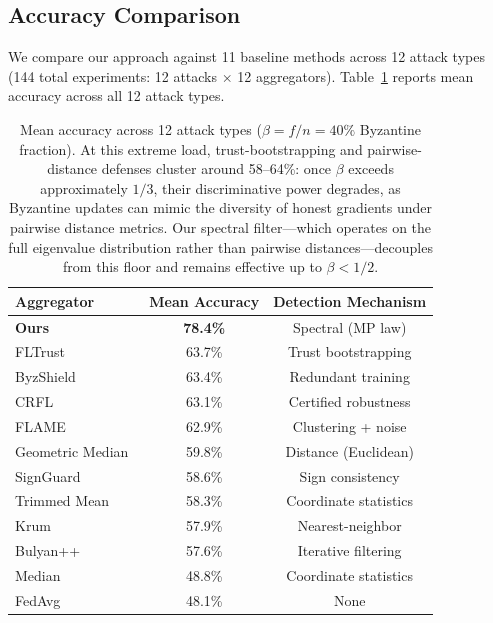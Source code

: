 \vspace{-4pt}
\subsection{Accuracy Comparison}

We compare our approach against 11 baseline methods across 12 attack types (144 total experiments: 12 attacks $\times$ 12 aggregators). Table~\ref{tab:accuracy_comparison} reports mean accuracy across all 12 attack types.

\begin{table}[!ht]
\centering
\caption{Mean accuracy across 12 attack types ($\beta = f/n = 40\%$ Byzantine fraction).
At this extreme load, trust-bootstrapping and pairwise-distance defenses cluster
around 58--64\%: once $\beta$ exceeds approximately $1/3$, their discriminative power
degrades, as Byzantine updates can mimic the diversity of honest gradients under
pairwise distance metrics.
Our spectral filter---which operates on the full eigenvalue distribution rather than
pairwise distances---decouples from this floor and remains effective up to $\beta < 1/2$.}
\label{tab:accuracy_comparison}
\begin{tabular}{|l|c|c|}
\hline
\textbf{Aggregator} & \textbf{Mean Accuracy} & \textbf{Detection Mechanism} \\
\hline
\textbf{Ours} & \textbf{78.4\%} & Spectral (MP law) \\
FLTrust~\cite{crfl} & 63.7\% & Trust bootstrapping \\
ByzShield~\cite{byzshield} & 63.4\% & Redundant training \\
CRFL~\cite{crfl_cert} & 63.1\% & Certified robustness \\
FLAME~\cite{flame} & 62.9\% & Clustering + noise \\
Geometric Median~\cite{geometric_median} & 59.8\% & Distance (Euclidean) \\
SignGuard~\cite{signguard} & 58.6\% & Sign consistency \\
Trimmed Mean~\cite{byzantine_ml} & 58.3\% & Coordinate statistics \\
Krum~\cite{krum} & 57.9\% & Nearest-neighbor \\
Bulyan++~\cite{bulyan} & 57.6\% & Iterative filtering \\
Median & 48.8\% & Coordinate statistics \\
FedAvg~\cite{fedavg_original} & 48.1\% & None \\
\hline
\end{tabular}
\end{table}

